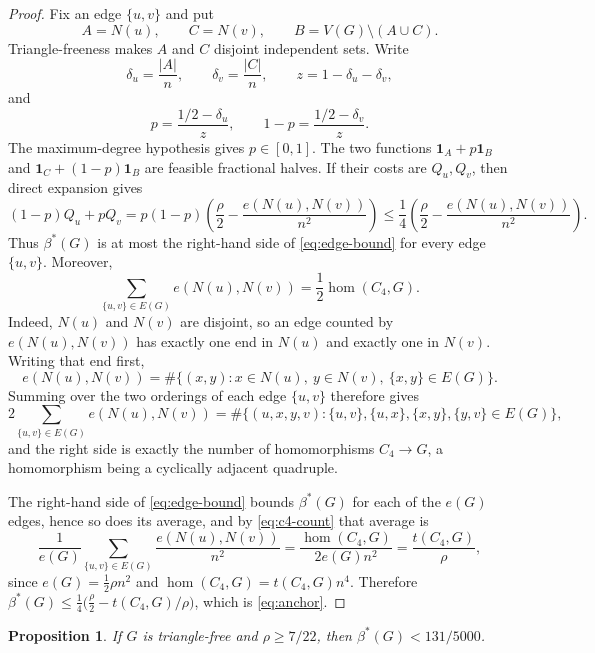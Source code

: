 \documentclass[11pt,reqno]{amsart}
\theoremstyle{plain}
\newtheorem{proposition}[theorem]{Proposition}
\newcommand{\Nb}{N}
\newcommand{\optf}{\beta^{*}}
\newcommand{\dens}{\rho}
\begin{document}
\begin{proof}
Fix an edge $\{u,v\}$ and put
\[
 A=\Nb(u),\qquad C=\Nb(v),\qquad
 B=V(G)\setminus(A\cup C).
\]
Triangle-freeness makes $A$ and $C$ disjoint independent sets.  Write
\[
 \delta_u=\frac{|A|}{n},\qquad \delta_v=\frac{|C|}{n},\qquad
 z=1-\delta_u-\delta_v,
\]
and
\[
 p=\frac{1/2-\delta_u}{z},\qquad
 1-p=\frac{1/2-\delta_v}{z}.
\]
The maximum-degree hypothesis gives $p\in[0,1]$.  The two functions
$\mathbf 1_A+p\mathbf 1_B$ and
$\mathbf 1_C+(1-p)\mathbf 1_B$ are feasible fractional halves.  If their
costs are $Q_u,Q_v$, then direct expansion gives
\begin{equation}\label{eq:edge-bound}
 (1-p)Q_u+pQ_v
 =p(1-p)\left(\frac{\dens}2-
 \frac{e(\Nb(u),\Nb(v))}{n^2}\right)
 \le\frac14\left(\frac{\dens}2-
 \frac{e(\Nb(u),\Nb(v))}{n^2}\right).
\end{equation}
Thus $\optf(G)$ is at most the right-hand side of \eqref{eq:edge-bound} for
every edge $\{u,v\}$.
Moreover,
\begin{equation}\label{eq:c4-count}
 \sum_{\{u,v\}\in E(G)}e(\Nb(u),\Nb(v))
 =\frac12\hom(C_4,G).
\end{equation}
Indeed, $\Nb(u)$ and $\Nb(v)$ are disjoint, so an edge counted by
$e(\Nb(u),\Nb(v))$ has exactly one end in $\Nb(u)$ and exactly one in
$\Nb(v)$.  Writing that end first,
\[
 e(\Nb(u),\Nb(v))=\#\{(x,y):x\in\Nb(u),\ y\in\Nb(v),\ \{x,y\}\in E(G)\}.
\]
Summing over the two orderings of each edge $\{u,v\}$ therefore gives
\[
 2\sum_{\{u,v\}\in E(G)}e(\Nb(u),\Nb(v))
 =\#\{(u,x,y,v):\{u,v\},\{u,x\},\{x,y\},\{y,v\}\in E(G)\},
\]
and the right side is exactly the number of homomorphisms $C_4\to G$, a
homomorphism being a cyclically adjacent quadruple.

The right-hand side of \eqref{eq:edge-bound} bounds $\optf(G)$ for each of the
$e(G)$ edges, hence so does its average, and by \eqref{eq:c4-count} that
average is
\[
 \frac1{e(G)}\sum_{\{u,v\}\in E(G)}\frac{e(\Nb(u),\Nb(v))}{n^{2}}
 =\frac{\hom(C_4,G)}{2e(G)n^{2}}
 =\frac{t(C_4,G)}{\dens},
\]
since $e(G)=\tfrac12\dens n^{2}$ and $\hom(C_4,G)=t(C_4,G)n^{4}$.  Therefore
$\optf(G)\le\tfrac14\bigl(\tfrac\dens2-t(C_4,G)/\dens\bigr)$, which is
\eqref{eq:anchor}.
\end{proof}

\begin{proposition}\label{prop:high}
If $G$ is triangle-free and $\dens\ge7/22$, then $\optf(G)<131/5000$.
\end{proposition}
\end{document}

